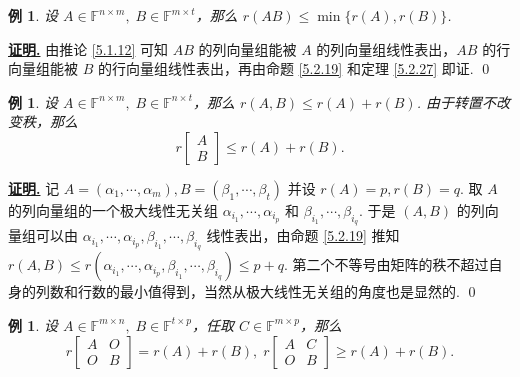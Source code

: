 \documentclass[10pt,openany]{article}
\theoremstyle{thmstyle} %
\theoremstyle{defstyle} %
\theoremstyle{prostyle} %
\theoremstyle{exastyle}
\newtheorem{example}[theorem]{例}
\theoremstyle{remstyle}
\renewenvironment{proof}[1][证明]{\par\underline{\textbf{#1.}} \;\fangsong}{\qed\par}
\newcommand{\F}{\mathbb{F}}
\newcommand{\mn}{^{m \times n}}
\newcommand{\nm}{^{n \times m}}
\begin{document}
\begin{example} 
	设 \( A \in \F\nm, \; B \in \F^{m \times t} \)，那么 \( r(AB) \leq \min\{r(A),r(B)\} \).
\end{example}

\begin{proof}
	由推论 \ref{5.1.12} 可知 \( AB \) 的列向量组能被 \( A \) 的列向量组线性表出，\( AB \) 的行向量组能被 \( B \) 的行向量组线性表出，再由命题 \ref{5.2.19} 和定理 \ref{5.2.27} 即证.
\end{proof}



\begin{example} 
	设 \( A \in \F\nm, \; B \in \F^{n \times t} \)，那么 \( r(A,B) \leq r(A)+r(B) \). 由于转置不改变秩，那么
	\[ r \begin{bmatrix}
		A \\ B
	\end{bmatrix} \leq r(A)+r(B). \]
\end{example}

\begin{proof}
	记 \( A=(\alpha_1,\cdots,\alpha_m), B=(\beta_1,\cdots,\beta_t) \) 并设 \( r(A)=p, r(B)=q \). 取 \( A \) 的列向量组的一个极大线性无关组 \( \alpha_{i_1},\cdots,\alpha_{i_p} \) 和 \( \beta_{i_1},\cdots,\beta_{i_q} \). 于是 \( (A,B) \) 的列向量组可以由 \( \alpha_{i_1},\cdots,\alpha_{i_p}, \beta_{i_1},\cdots,\beta_{i_q} \) 线性表出，由命题 \ref{5.2.19} 推知 \( r(A,B) \leq r(\alpha_{i_1},\cdots,\alpha_{i_p}, \beta_{i_1},\cdots,\beta_{i_q}) \leq p+q \). 第二个不等号由矩阵的秩不超过自身的列数和行数的最小值得到，当然从极大线性无关组的角度也是显然的.
\end{proof}


\begin{example}
	设 \( A \in \F\mn, \; B \in \F^{t \times p} \)，任取 \( C \in \F^{m \times p}\)，那么
	\[ r \begin{bmatrix}
		A & O \\ O & B
	\end{bmatrix}=r(A)+r(B), \; r \begin{bmatrix}
		A & C \\ O & B
	\end{bmatrix} \geq r(A)+r(B). \]
\end{example}
\end{document}
